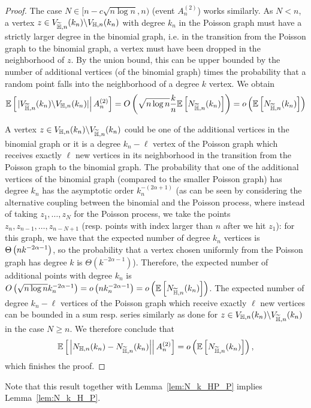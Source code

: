 \begin{proof}
The case $N \in [n-c\sqrt{n\log n},n)$ (event $A_n^{(2)}$) works similarly.
As $N < n$, a vertex $z \in V_{\widetilde{\mathbb{H}},n}(k_n) \backslash V_{\mathbb{H},n}(k_n)$ with degree $k_n$ in the Poisson graph must have a strictly larger degree in the binomial graph, i.e. in the transition from the Poisson graph to the binomial graph, a vertex must have been dropped in the neighborhood of $z$. By the union bound, this can be upper bounded by the number of additional vertices (of the binomial graph) times the probability that a random point falls into the neighborhood of a degree $k$ vertex. We obtain
\begin{align*}
	\mathbb{E}\left[\left.|V_{\widetilde{\mathbb{H}},n}(k_n) \backslash V_{\mathbb{H},n}(k_n)|\right|A_n^{(2)}\right] = O\left( \sqrt{n\log n}\frac{k}{n} \mathbb{E}\left[N_{\widetilde{\mathbb{H}},n}(k_n)\right] \right)
	= o\left(\mathbb{E}\left[N_{\widetilde{\mathbb{H}},n}(k_n)\right]\right)
\end{align*}

A vertex $z \in V_{\mathbb{H},n}(k_n) \backslash V_{\widetilde{\mathbb{H}},n}(k_n)$ could be one of the additional vertices in the binomial graph or it is a degree $k_n-\ell$ vertex of the Poisson graph which receives exactly $\ell$ new vertices in its neighborhood in the transition from the Poisson graph to the binomial graph. The probability that one of the additional vertices of the binomial graph (compared to the smaller Poisson graph) has degree $k_n$ has the asymptotic order $k_n^{-(2\alpha+1)}$ (as can be seen by considering the alternative coupling between the binomial and the Poisson process, where instead of taking $z_1, \dots, z_N$ for the Poisson process, we take the points $z_n, z_{n-1}, \dots, z_{n-N+1}$ (resp. points with index larger than $n$ after we hit $z_1$): for this graph, we have that the expected number of degree $k_n$ vertices is $\Theta\left(n k^{-2\alpha-1}\right)$, so the probability that a vertex chosen uniformly from the Poisson graph has degree $k$ is $\Theta(k^{-2\alpha-1})$). Therefore, the expected number of additional points with degree $k_n$ is $O\left(\sqrt{n\log n} k_n^{-2\alpha-1}\right) = o\left(n k_n^{-2\alpha-1}\right) = o\left(\mathbb{E}\left[N_{\widetilde{\mathbb{H}},n}(k_n)\right]\right)$. The expected number of degree $k_n-\ell$ vertices of the Poisson graph which receive exactly $\ell$ new vertices can be bounded in a sum resp. series similarly as done for $z \in V_{\mathbb{H},n}(k_n) \backslash V_{\widetilde{\mathbb{H}},n}(k_n)$ in the case $N \geq n$. We therefore conclude that
\[
	\mathbb{E}\left[\left.\left|N_{\mathbb{H},n}(k_n)-N_{\widetilde{\mathbb{H}},n}(k_n)\right|\right|A_n^{(2)}\right] = o\left(\mathbb{E}\left[N_{\widetilde{\mathbb{H}},n}(k_n)\right]\right),
\]
which finishes the proof.
\end{proof}

Note that this result together with Lemma~\ref{lem:N_k_HP_P} implies Lemma~\ref{lem:N_k_H_P}.

